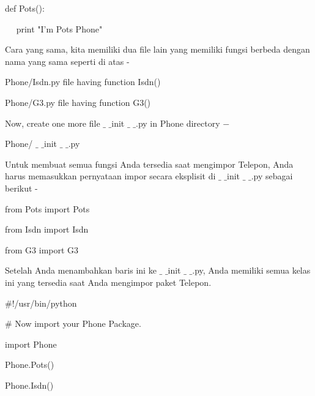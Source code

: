 \vspace{12pt}
\noindent 
 \hspace*{0.5in} def Pots(): \par
\noindent 
 \hspace*{0.5in} ~~ print "I'm Pots Phone" \par
\noindent 
Cara yang sama, kita memiliki dua file lain yang memiliki fungsi berbeda dengan nama yang sama seperti di atas - \par
\noindent 
Phone/Isdn.py $  $file having function Isdn() \par
\noindent 
Phone/G3.py $  $file having function G3() \par
\vspace{12pt}
\noindent 
Now, create one more file  $  \_  $ $  \_  $init $  \_  $ $  \_  $.py in $  $Phone $  $directory  $ - $ \par
\noindent 
Phone/ $  \_  $ $  \_  $init $  \_  $ $  \_  $.py \par
\noindent 
Untuk membuat semua fungsi Anda tersedia saat mengimpor Telepon, Anda harus memasukkan pernyataan impor secara eksplisit di  $  \_  $ $  \_  $init $  \_  $ $  \_  $.py sebagai berikut - \par
\noindent 
 \hspace*{0.5in} from Pots import Pots \par
\noindent 
 \hspace*{0.5in} from Isdn import Isdn \par
\noindent 
 \hspace*{0.5in} from G3 import G3 \par
\vspace{12pt}
\noindent 
Setelah Anda menambahkan baris ini ke  $  \_  $ $  \_  $init $  \_  $ $  \_  $.py, Anda memiliki semua kelas ini yang tersedia saat Anda mengimpor paket Telepon. \par
\noindent 
 \hspace*{0.5in}  $  \#  $!/usr/bin/python \par
\vspace{12pt}
\noindent 
 \hspace*{0.5in}  $  \#  $ Now import your Phone Package. \par
\noindent 
 \hspace*{0.5in} import Phone \par
\vspace{12pt}
\noindent 
 \hspace*{0.5in} Phone.Pots() \par
\noindent 
 \hspace*{0.5in} Phone.Isdn() \par
